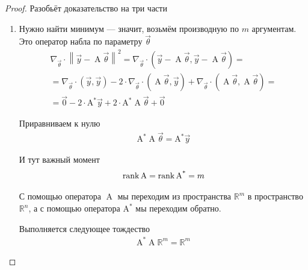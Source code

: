 \begin{proof}
    Разобьёт доказательство на три части

    \begin{enumerate}
        \item Нужно найти минимум --- значит, возьмём производную по $m$
            аргументам. Это оператор набла по параметру $\vec{\theta}$
            \begin{align*}
                \nabla_{\vec{\theta}} \cdot \left\| \vec{y}
                    - \operatorname{A} \vec{\theta} \right\|^2
                = \nabla_{\vec{\theta}} \cdot
                    \left( \vec{y} - \operatorname{A} \vec{\theta},
                    \vec{y} - \operatorname{A} \vec{\theta} \right) = \\
                = \nabla_{\vec{\theta}} \cdot \left( \vec{y}, \vec{y} \right)
                    - 2 \cdot \nabla_{\vec{\theta}} \cdot
                        \left( \operatorname{A} \vec{\theta}, \vec{y} \right)
                    + \nabla_{\vec{\theta}} \cdot
                        \left( \operatorname{A} \vec{\theta},
                            \operatorname{A} \vec{\theta} \right) = \\
                = \vec{0} - 2 \cdot \operatorname{A^*} \vec{y}
                    + 2 \cdot \operatorname{A^*} \operatorname{A} \vec{\theta}
                    + \vec{0}
            \end{align*}

            Приравниваем к нулю
            \begin{align*}
                \operatorname{A^*} \operatorname{A} \vec{\theta}
                = \operatorname{A^*} \vec{y}
            \end{align*}

            И тут важный момент
            \begin{align*}
                \operatorname{rank}{\operatorname{A}} = \operatorname{rank}{\operatorname{A^*}} = m
            \end{align*}

            С помощью оператора $\operatorname{A}$ мы переходим из пространства
            $\mathbb{R}^m$ в пространство $\mathbb{R}^n$, а с помощью оператора
            $\operatorname{A^*}$ мы переходим обратно.

            Выполняется следующее тождество
            \begin{align*}
                \operatorname{A^*} \operatorname{A} \mathbb{R}^m = \mathbb{R}^m
            \end{align*}


\end{enumerate}
\end{proof}
